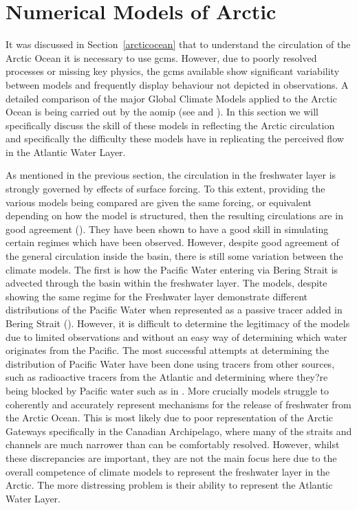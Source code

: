 \documentclass[12pt,a4paper]{report}
\newcommand*\secref[1]{Section~\ref{#1}}
\begin{document}
\section{Numerical Models of Arctic}
\label{arcticnumerics}

	It was discussed in \secref{arcticocean} that to understand the circulation of the Arctic
	 Ocean it is necessary to use \glspl{gcm}. However, due to poorly resolved processes or
	  missing key physics, the \glspl{gcm} available show significant variability between
	   models and frequently display behaviour not depicted in observations. 
	A detailed comparison of the major Global Climate Models applied to the Arctic Ocean is
	 being carried out by the \gls{aomip} (see \cite{proshutinsky2008toward} and
	  \cite{proshutinsky2011recent}). In this section we will specifically discuss the skill
	   of these models in reflecting the Arctic circulation and specifically the difficulty
	    these models have in replicating the perceived flow in the Atlantic Water Layer.  

As mentioned in the previous section, the circulation in the freshwater layer is strongly
 governed by effects of surface forcing. To this extent, providing the various models being
  compared are given the same forcing, or equivalent depending on how the model is
   structured, then the resulting circulations are in good agreement
    (\cite{proshutinsky2005arctic}). They have been shown to have a good skill in simulating
     certain regimes which have been observed. However, despite good agreement of the general
      circulation inside the basin, there is still some variation between the climate models.
       The first is how the Pacific Water entering via Bering Strait is advected through the
    basin within the freshwater layer. The models, despite showing the same regime for the
     Freshwater layer demonstrate different distributions of the Pacific Water when
      represented as a passive tracer added in Bering Strait (\cite{proshutinsky2011recent}).
       However, it is difficult to
       determine the legitimacy of the models
       due to limited observations and without an easy way of determining which water originates from the Pacific. The
     most successful attempts at determining the distribution of Pacific Water have been
     done using tracers from other sources, such as radioactive tracers from the Atlantic and
      determining where they?re being blocked by Pacific water such as in \cite{karcher2004dispersion}. More crucially models struggle to coherently and accurately represent
    mechanisms for the release of freshwater from the Arctic Ocean. This is most likely
     due to poor representation of the Arctic Gateways specifically in the Canadian
      Archipelago, where many of the straits and channels are much narrower than can be
   comfortably resolved. However, whilst these discrepancies are important, they are
    not the main focus here due to the overall competence of climate models to
 represent the freshwater layer in the Arctic. The more distressing problem is
  their ability to represent the Atlantic Water Layer. 
\end{document}
